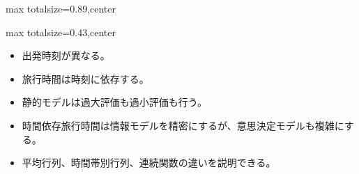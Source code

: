 \begin{minipage}[t]{0.58\textwidth}
\begin{adjustbox}{max totalsize={\textwidth}{0.89\textheight},center}
\begin{minipage}{\textwidth}
\end{minipage}
\end{adjustbox}
\end{minipage}


\clearpage
{}
\begin{minipage}[t]{0.405\textwidth}
\begin{adjustbox}{max totalsize={\textwidth}{0.43\textheight},center}
\begin{minipage}{\textwidth}\scriptsize
{}\begin{itemize}
\item 出発時刻が異なる。
\item 旅行時間は時刻に依存する。
\item 静的モデルは過大評価も過小評価も行う。
\end{itemize}\begin{itemize}
\item 時間依存旅行時間は情報モデルを精密にするが、意思決定モデルも複雑にする。
\item 平均行列、時間帯別行列、連続関数の違いを説明できる。
\end{itemize}
\end{minipage}
\end{adjustbox}
\end{minipage}\hfill
